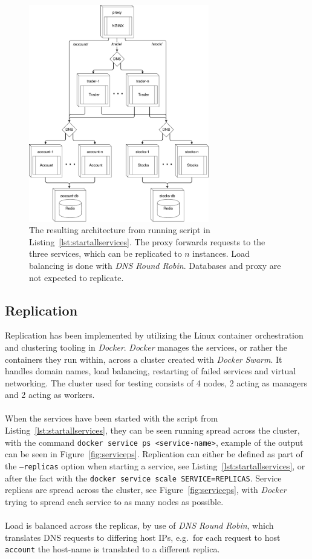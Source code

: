 \begin{figure}[H]
\centering
\includegraphics[width=0.7\textwidth]{../media/container_architecture.pdf} 
\caption{The resulting architecture from running script in
	Listing~\ref{lst:startallservices}. The proxy forwards requests to the three
		services, which can be replicated to $n$ instances. Load balancing is done
		with \textit{DNS Round Robin}. Databases and proxy are not expected to
		replicate.}
\label{fig:containerarchitecture}
\end{figure}

\subsection{Replication}
Replication has been implemented by utilizing the Linux container orchestration
and clustering tooling in \textit{Docker}. \textit{Docker} manages the
services, or rather the containers they run within, across a cluster created
with \textit{Docker Swarm}. It handles domain names, load balancing, restarting
of failed services and virtual networking. The cluster used for testing
consists of 4 nodes, 2 acting as managers and 2 acting as workers. 
\\\\
When the services have been started with the script from 
Listing~\ref{lst:startallservices}, they can be seen running spread across the
cluster, with the command \texttt{docker service ps <service-name>}, example of the
output can be seen in Figure~\ref{fig:serviceps}. Replication can either be
defined as part of the \texttt{--replicas} option when starting a service, see
Listing~\ref{lst:startallservices}, or after the fact with the \texttt{docker service scale
SERVICE=REPLICAS}. Service replicas are spread across the cluster, see
Figure~\ref{fig:serviceps}, with \textit{Docker} trying to spread each service to as
many nodes as possible.
\\\\
Load is balanced across the replicas, by use of \textit{DNS Round Robin}, which
translates DNS requests to differing host IPs, e.g.\ for each request to host
\texttt{account} the host-name is translated to a different replica.

